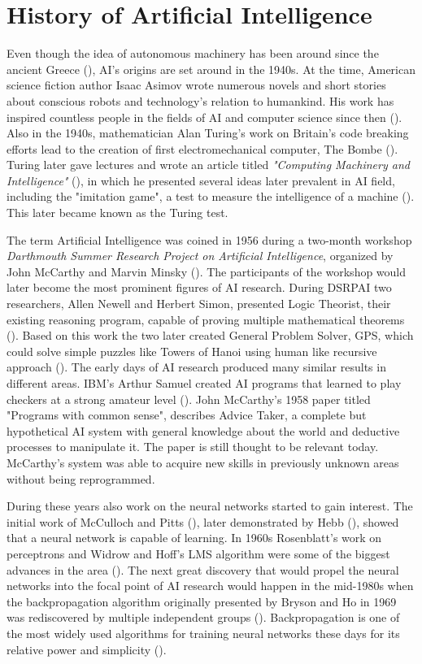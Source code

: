 \documentclass[utf8,english]{gradu3}
\begin{document}
\section{History of Artificial Intelligence}
\label{history}

Even though the idea of autonomous machinery has been around since the ancient
Greece (\cite{bramer2009artificial}), AI's origins are set around in the 1940s.
At the time, American science fiction author Isaac Asimov wrote numerous novels
and short stories about conscious robots and technology's relation to humankind.
His work has inspired countless people in the fields of AI and computer science
since then (\cite{kaplan2019}). Also in the 1940s, mathematician Alan Turing's
work on Britain's code breaking efforts lead to the creation of first
electromechanical computer, The Bombe (\cite{kaplan2019}). Turing later gave
lectures and wrote an article titled \emph{"Computing Machinery and
Intelligence"} (\cite*{turing1950}), in which he presented several ideas later
prevalent in AI field, including the "imitation game", a test to measure the
intelligence of a machine (\cite{norvig2002}). This later became known as the
Turing test.

The term Artificial Intelligence was coined in 1956 during a two-month workshop
\emph{Darthmouth Summer Research Project on Artificial Intelligence}, organized
by John McCarthy and Marvin Minsky (\cite{kaplan2019}). The participants of the
workshop would later become the most prominent figures of AI research. During
DSRPAI two researchers, Allen Newell and Herbert Simon, presented Logic
Theorist, their existing reasoning program, capable of proving multiple
mathematical theorems (\cite{norvig2002}). Based on this work the two later
created General Problem Solver, GPS, which could solve simple puzzles like
Towers of Hanoi using human like recursive approach (\cite{newell1959}). The
early days of AI research produced many similar results in different areas.
IBM's Arthur Samuel created AI programs that learned to play checkers at a
strong amateur level (\cite{norvig2002}). John McCarthy's 1958 paper titled
"Programs with common sense", describes Advice Taker, a complete but
hypothetical AI system with general knowledge about the world and deductive
processes to manipulate it. The paper is still thought to be relevant today.
McCarthy's system was able to acquire new skills in previously unknown areas
without being reprogrammed.

During these years also work on the neural networks started to gain interest.
The initial work of McCulloch and Pitts (\cite*{mcculloch1943}), later
demonstrated by Hebb (\cite{norvig2002}), showed that a neural network is
capable of learning. In 1960s Rosenblatt's work on perceptrons and Widrow and
Hoff's LMS algorithm were some of the biggest advances in the area
(\cite{widrow1995}). The next great discovery that would propel the neural
networks into the focal point of AI research would happen in the mid-1980s when
the backpropagation algorithm originally presented by Bryson and Ho in 1969 was
rediscovered by multiple independent groups (\cite{norvig2002}). Backpropagation
is one of the most widely used algorithms for training neural networks these
days for its relative power and simplicity (\cite{rumelhart1995}).
\end{document}

